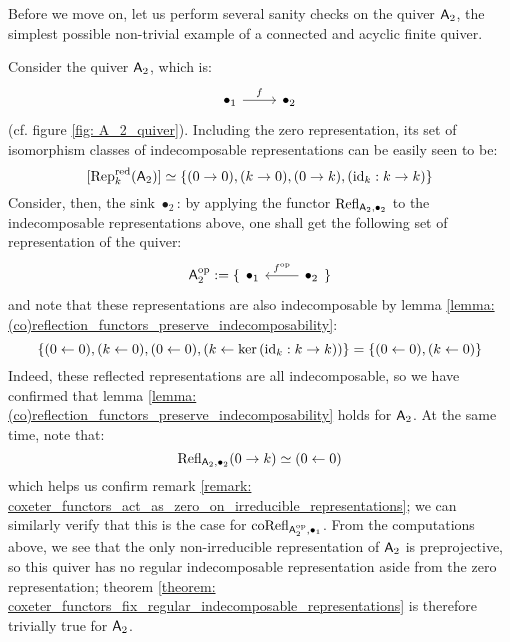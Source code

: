             Before we move on, let us perform several sanity checks on the quiver $\mathsf{A}_2$, the simplest possible non-trivial example of a connected and acyclic finite quiver. 
            \begin{example} \label{example: indecomposable_representations_of_A2_quiver}
                Consider the quiver $\mathsf{A}_2$, which is:
                    $$
                        \begin{tikzcd}
                        	{\bullet_1} & {\bullet_2}
                        	\arrow["f", from=1-1, to=1-2]
                        \end{tikzcd}
                    $$
                (cf. figure \ref{fig: A_2_quiver}). Including the zero representation, its set of isomorphism classes of indecomposable representations can be easily seen to be:
                    $$[\mathrm{Rep}_k^{\mathrm{red}}(\mathsf{A}_2)] \simeq \left\{(0 \to 0), (k \to 0), (0 \to k), (\mathrm{id}_k: k \to k)\right\}$$
                Consider, then, the sink $\bullet_2$: by applying the functor $\mathrm{Refl}_{\mathsf{A}_2, \bullet_2}$ to the indecomposable representations above, one shall get the following set of representation of the quiver:
                    $$
                        \sfA_2^{\op} :=
                        \{
                            \begin{tikzcd}
                            	{\bullet_1} & {\bullet_2}
                            	\arrow["{f^{\op}}"', from=1-2, to=1-1]
                            \end{tikzcd}
                        \}
                    $$
                and note that these representations are also indecomposable by lemma \ref{lemma: (co)reflection_functors_preserve_indecomposability}:
                    $$\left\{(0 \leftarrow 0), (k \leftarrow 0), (0 \leftarrow 0), \left(k \leftarrow \ker\left(\mathrm{id}_k: k \to k\right)\right)\right\} = \left\{(0 \leftarrow 0), (k \leftarrow 0)\right\}$$
                Indeed, these reflected representations are all indecomposable, so we have confirmed that lemma \ref{lemma: (co)reflection_functors_preserve_indecomposability} holds for $\mathsf{A}_2$. At the same time, note that:
                    $$\mathrm{Refl}_{\mathsf{A}_2, \bullet_2}(0 \to k) \simeq (0 \leftarrow 0)$$
                which helps us confirm remark \ref{remark: coxeter_functors_act_as_zero_on_irreducible_representations}; we can similarly verify that this is the case for $\mathrm{co}\mathrm{Refl}_{\mathsf{A}_2^{\mathrm{op}}, \bullet_1}$. From the computations above, we see that the only non-irreducible representation of $\mathsf{A}_2$ is preprojective, so this quiver has no regular indecomposable representation aside from the zero representation; theorem \ref{theorem: coxeter_functors_fix_regular_indecomposable_representations} is therefore trivially true for $\mathsf{A}_2$. 
            \end{example}
            
